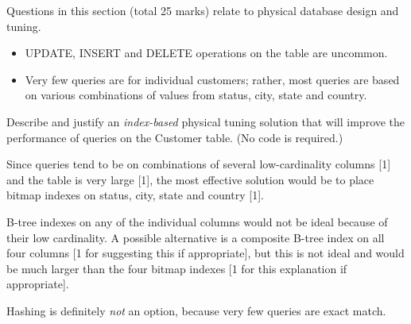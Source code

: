\documentclass{ouexam}
\begin{document}
\begin{examsection}{25}{}{Questions in this section (total 25 marks) relate to
physical database design and tuning.}
\begin{question}{10}
\begin{itemize}
		\item UPDATE, INSERT and DELETE operations on the table are uncommon.

		\item Very few queries are for individual customers; rather, most
		queries are based on various combinations of values from
		\textsf{status}, \textsf{city}, \textsf{state} and \textsf{country}.

	\end{itemize}
	\medskip


	\begin{subquestion}{3}
		Describe and justify an \emph{index-based} physical tuning solution
		that will improve the performance of queries on the \textsf{Customer}
		table. (No code is required.)
		\begin{marking}
			Since queries tend to be on combinations of several low-cardinality
			columns [1] and the table is very large [1], the most effective
			solution would be to place bitmap indexes on status, city, state
			and country [1].

			B-tree indexes on any of the individual columns would not be ideal
			because of their low cardinality. A possible alternative is a
			composite B-tree index on all four columns [1 for suggesting this
			if appropriate], but this is not ideal and would be much larger
			than the four bitmap indexes [1 for this explanation if
			appropriate].

			Hashing is definitely \emph{not} an option, because very few
			queries are exact match.
		\end{marking}
	\end{subquestion}
		


\end{question}
\end{examsection}
\end{document}
